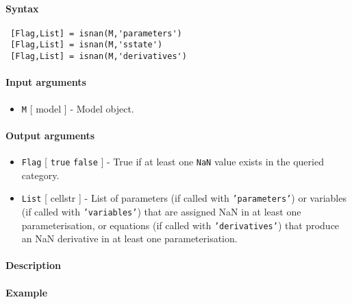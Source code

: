 


	\paragraph{Syntax}
 
 \begin{verbatim}
 [Flag,List] = isnan(M,'parameters')
 [Flag,List] = isnan(M,'sstate')
 [Flag,List] = isnan(M,'derivatives')
 \end{verbatim}
 
 \paragraph{Input arguments}
 
 \begin{itemize}
 \item
   \texttt{M} {[} model {]} - Model object.
 \end{itemize}
 
 \paragraph{Output arguments}
 
 \begin{itemize}
 \item
   \texttt{Flag} {[} \texttt{true} \textbar{} \texttt{false} {]} - True
   if at least one \texttt{NaN} value exists in the queried category.
 \item
   \texttt{List} {[} cellstr {]} - List of parameters (if called with
   \texttt{'parameters'}) or variables (if called with
   \texttt{'variables'}) that are assigned NaN in at least one
   parameterisation, or equations (if called with \texttt{'derivatives'})
   that produce an NaN derivative in at least one parameterisation.
 \end{itemize}
 
 \paragraph{Description}
 
 \paragraph{Example}


